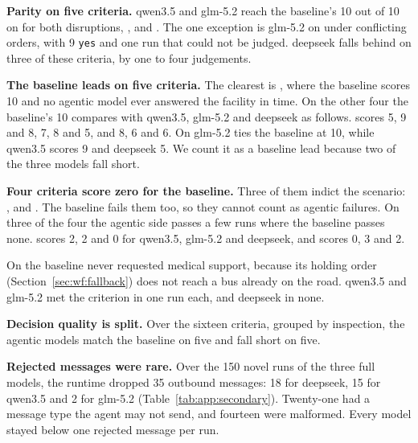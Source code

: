 \begin{sloppypar}
\textbf{Parity on five criteria.} qwen3.5 and glm-5.2 reach the baseline's 10
out of 10 on  for both disruptions,
,  and
. The one exception is glm-5.2 on
 under conflicting orders, with 9 \texttt{yes} and
one run that could not be judged. deepseek falls behind on three of these
criteria, by one to four judgements.

\textbf{The baseline leads on five criteria.} The clearest is
, where the baseline scores 10 and no agentic
model ever answered the facility in time. On the other four the baseline's 10
compares with qwen3.5, glm-5.2 and deepseek as follows.
 scores 5, 9 and 8,
 7, 8 and 5, and
 8, 6 and 6. On
 glm-5.2 ties the baseline at 10, while qwen3.5
scores 9 and deepseek 5. We count it as a baseline lead because two of the
three models fall short.
\end{sloppypar}

\textbf{Four criteria score zero for the baseline.} Three of them indict the
scenario: ,
 and
. The baseline fails them too,
so they cannot count as agentic failures. On three of the four the agentic side
passes a few runs where the baseline passes none.
 scores 2, 2 and 0 for qwen3.5, glm-5.2
and deepseek, and  scores 0, 3 and 2.

On  the baseline never requested
medical support, because its holding order (Section~\ref{sec:wf:fallback})
does not reach a bus already on the road. qwen3.5 and glm-5.2 met the
criterion in one run each, and deepseek in none.

\textbf{Decision quality is split.} Over the sixteen criteria, grouped by
inspection, the agentic models match the baseline on five and fall short on
five.

\textbf{Rejected messages were rare.} Over the 150 novel runs of the three
full models, the runtime dropped 35 outbound messages: 18 for deepseek, 15 for
qwen3.5 and 2 for glm-5.2 (Table~\ref{tab:app:secondary}). Twenty-one had a
message type the agent may not send, and fourteen were malformed. Every model
stayed below one rejected message per run.

